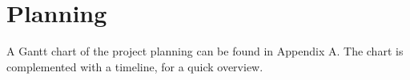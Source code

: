\section{Planning}
A Gantt chart of the project planning can be found in Appendix A. The chart is complemented with a timeline, for a quick overview.
